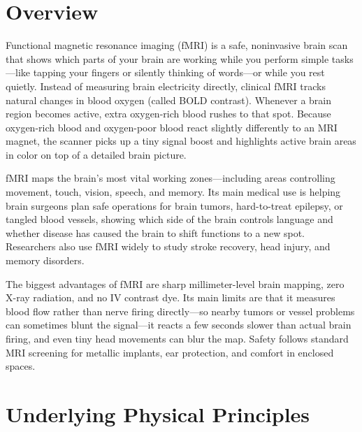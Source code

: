 \label{ch:infographic-functional}

\section{Overview}

Functional magnetic resonance imaging (fMRI) is a safe, noninvasive brain scan that shows which parts of your brain are working while you perform simple tasks---like tapping your fingers or silently thinking of words---or while you rest quietly. Instead of measuring brain electricity directly, clinical fMRI tracks natural changes in blood oxygen (called BOLD contrast). Whenever a brain region becomes active, extra oxygen-rich blood rushes to that spot. Because oxygen-rich blood and oxygen-poor blood react slightly differently to an MRI magnet, the scanner picks up a tiny signal boost and highlights active brain areas in color on top of a detailed brain picture.

fMRI maps the brain's most vital working zones---including areas controlling movement, touch, vision, speech, and memory. Its main medical use is helping brain surgeons plan safe operations for brain tumors, hard-to-treat epilepsy, or tangled blood vessels, showing which side of the brain controls language and whether disease has caused the brain to shift functions to a new spot. Researchers also use fMRI widely to study stroke recovery, head injury, and memory disorders.

The biggest advantages of fMRI are sharp millimeter-level brain mapping, zero X-ray radiation, and no IV contrast dye. Its main limits are that it measures blood flow rather than nerve firing directly---so nearby tumors or vessel problems can sometimes blunt the signal---it reacts a few seconds slower than actual brain firing, and even tiny head movements can blur the map. Safety follows standard MRI screening for metallic implants, ear protection, and comfort in enclosed spaces.

\section{Underlying Physical Principles}


